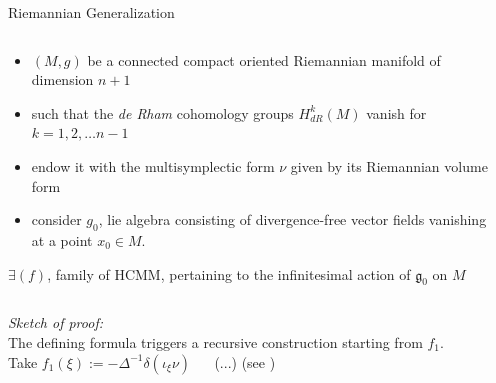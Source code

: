 \documentclass[beamer,10pt]{standalone}
\begin{document}
  \begin{frame}[shrink]{Riemannian Generalization}\label{frame:RiemannianGeneralization}
			\begin{columns}
				\begin{column}{.5\linewidth}
					\begin{itemize}
						\item  $(M,g)$ be a connected compact oriented Riemannian manifold of dimension $n+1$
						\item such that the {\it de Rham} cohomology groups $H_{dR}^{k}(M)$ vanish for $k=1,2,\dots n-1$ 
						\item endow it with the multisymplectic form $\nu$ given by its Riemannian volume form
						\item consider $g_0$, lie algebra consisting of divergence-free vector fields vanishing at a point $x_0 \in M$.
					\end{itemize}
					\begin{claimblock}
						$\exists (f)$, family of HCMM, pertaining to the infinitesimal action of $\mathfrak{g}_0$ on $M$
					\end{claimblock}
				\end{column}
				\begin{column}{.5\linewidth}
 			 		
				\end{column}
			\end{columns}
		\textit{Sketch of proof:}\\
			The defining formula triggers a recursive construction starting from $f_1$.\\
			Take $ f_1(\xi) := -\Delta^{-1} \delta (\iota_{\xi} \nu)$
			$\quad$ (...) (see \cite{Miti2018})
  \end{frame}
\end{document}
